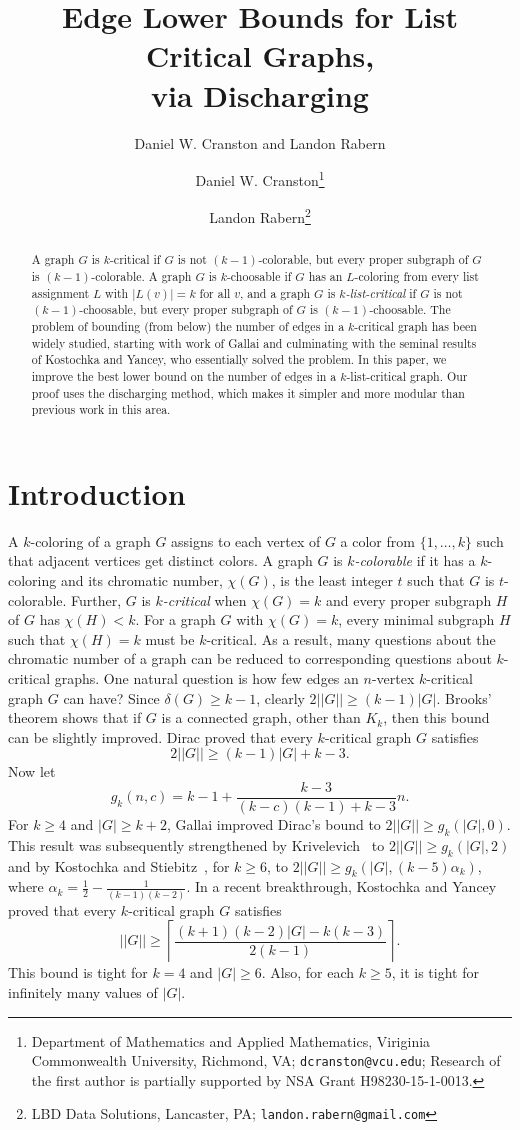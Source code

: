 \documentclass[12pt]{article}
\title{Edge Lower Bounds for List Critical Graphs,\\ via Discharging}
\author{Daniel W. Cranston and Landon Rabern}
\author{Daniel W. Cranston\thanks{Department of Mathematics and Applied
Mathematics, Viriginia Commonwealth University, Richmond, VA;
\texttt{dcranston@vcu.edu}; 
Research of the first author is partially supported by NSA Grant
H98230-15-1-0013.}
\and
Landon Rabern\thanks{LBD Data Solutions, Lancaster, PA;
\texttt{landon.rabern@gmail.com}}
	}
\theoremstyle{plain}
\theoremstyle{definition}
\theoremstyle{remark}
\newcommand{\ceil}[1]{\left\lceil#1\right\rceil}
\begin{document}
\maketitle
\begin{abstract}
A graph $G$ is $k$-critical if $G$ is not $(k-1)$-colorable, but every proper
subgraph of $G$ is $(k-1)$-colorable.
A graph $G$ is $k$-choosable if $G$ has an $L$-coloring from every list
assignment $L$ with $|L(v)|=k$ for all $v$, and a graph $G$ is
\emph{$k$-list-critical} if $G$ is not $(k-1)$-choosable, but every
proper subgraph of $G$ is $(k-1)$-choosable.  The problem of bounding (from below)
the number of edges in a $k$-critical graph has been widely studied, starting
with work of Gallai and culminating with the seminal results of Kostochka and
Yancey, who essentially solved the problem.  In this paper, we improve the best
lower bound on the number of edges in a $k$-list-critical graph.  Our proof
uses the discharging method, which makes it simpler and more modular than previous
work in this area.
\end{abstract}

\section{Introduction}
A $k$-coloring of a graph $G$ assigns to each vertex of $G$ a color from
$\{1,\ldots,k\}$ such that adjacent vertices get distinct colors.  A graph $G$ is
\emph{$k$-colorable} if it has a $k$-coloring and its chromatic number,
$\chi(G)$, is the least integer $t$ such that $G$ is $t$-colorable.  
Further, $G$ is \emph{$k$-critical} when $\chi(G)=k$ and every proper subgraph
$H$ of $G$ has $\chi(H)<k$.  For a graph $G$ with $\chi(G)=k$, every minimal
subgraph $H$ such that $\chi(H)=k$ must be $k$-critical.  As a result, many
questions about the chromatic number of a graph can be reduced to corresponding
questions about $k$-critical graphs.  One natural question is how few edges an
$n$-vertex $k$-critical graph $G$ can have?  Since $\delta(G)\ge k-1$, clearly
$2||G|| \ge (k-1)|G|$.  Brooks' theorem shows that if $G$ is a connected graph,
other than $K_k$, then this bound can be slightly improved.  Dirac proved that
every $k$-critical graph $G$ satisfies 
$$
2||G|| \ge (k-1)|G|+k-3.
$$
Now let 
$$
g_k(n,c) = k-1 + \frac{k-3}{(k-c)(k-1)+k-3}n.
$$
For $k\ge 4$ and $|G|\ge k+2$, Gallai improved Dirac's bound to $2||G|| \ge
g_k(|G|,0)$.  This result was subsequently strengthened by
Krivelevich~\cite{krivelevich1997minimal} to $2||G||\ge g_k(|G|,2)$ and by Kostochka and
Stiebitz~\cite{kostochkastiebitzedgesincriticalgraph}, for $k\ge 6$, to $2||G||
\ge g_k(|G|,(k-5)\alpha_k)$, where $\alpha_k = \frac12-\frac1{(k-1)(k-2)}$.
In a recent breakthrough, Kostochka and Yancey~\cite{kostochkayancey2012ore}
proved that every $k$-critical graph $G$ satisfies
$$
||G|| \ge \ceil{\frac{(k+1)(k-2)|G|-k(k-3)}{2(k-1)}}.
$$
This bound is tight for $k=4$ and $|G|\ge 6$.  Also, for each $k\ge 5$, it is tight
for infinitely many values of $|G|$.
\end{document}
